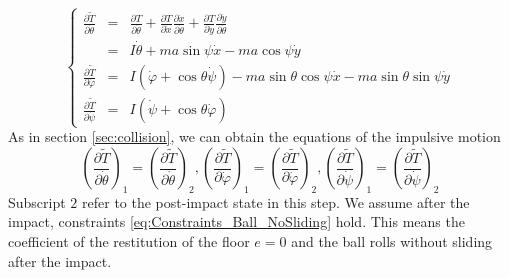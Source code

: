 \documentclass[preprint,12pt]{elsarticle}
\begin{document}
\begin{equation}
\left\{\begin{array}{rcl}

    \frac{\partial \tilde{T}}{\partial \dot{\theta}} & = &\frac{\partial T}{\partial \dot{\theta}}+\frac{\partial T}{\partial \dot{x}}\frac{\partial \dot{x}}{\partial \dot{\theta}} +\frac{\partial T}{\partial \dot{y}}\frac{\partial \dot{y}}{\partial \dot{\theta}}\\
    &=&I\dot{\theta}+ma\sin\psi \dot{x}-ma\cos\psi \dot{y}\\[12pt]
    \frac{\partial \tilde{T}}{\partial \dot{\varphi}} & =&I\left(\dot{\varphi}+\cos\theta \dot{\psi}\right)-ma\sin\theta \cos\psi \dot{x}-ma\sin\theta\sin\psi \dot{y}\\[12pt]
    \frac{\partial \tilde{T}}{\partial \dot{\psi}} &=& I\left(\dot{\psi}+\cos\theta \dot{\varphi}\right)
  \end{array}\right.
\end{equation}
As in section \ref{sec:collision}, we can obtain the equations of the impulsive motion
\begin{equation}\label{eq:Impulsive_Motion_2}
  \left(\frac{\partial \tilde{T}}{\partial \dot{\theta}}\right)_1=\left(\frac{\partial \tilde{T}}{\partial \dot{\theta}}\right)_2,\left(\frac{\partial \tilde{T}}{\partial \dot{\varphi}}\right)_1=\left(\frac{\partial \tilde{T}}{\partial \dot{\varphi}}\right)_2,\left(\frac{\partial \tilde{T}}{\partial \dot{\psi}}\right)_1=\left(\frac{\partial \tilde{T}}{\partial \dot{\psi}}\right)_2
\end{equation}
Subscript $2$ refer to the post-impact state in this step.
We assume after the impact, constraints \eqref{eq:Constraints_Ball_NoSliding} hold. This means the coefficient of the restitution of the floor $e=0$ and the ball rolls without sliding after the impact.
\end{document}
